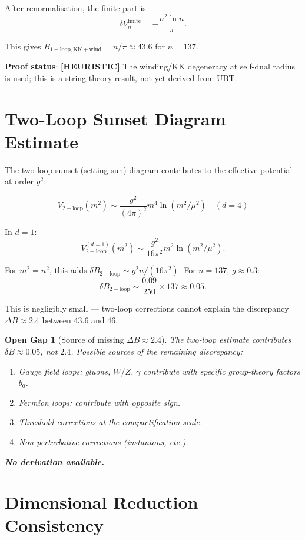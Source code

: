 \documentclass[11pt,a4paper]{article}
\newtheorem{gap}{Open Gap}
\newcommand{\heuristic}[1]{\textbf{[HEURISTIC]} #1}
\begin{document}
After renormalisation, the finite part is
\[
  \delta V_n^\mathrm{finite} = -\frac{n^2\ln n}{\pi}.
\]

This gives $B_\mathrm{1-loop,KK+wind} = n/\pi \approx 43.6$ for $n = 137$.

\textbf{Proof status}: \heuristic{The winding/KK degeneracy at self-dual
radius is used; this is a string-theory result, not yet derived from UBT.}

\section{Two-Loop Sunset Diagram Estimate}

The two-loop sunset (setting sun) diagram contributes to the effective
potential at order $g^2$:

\[
  V_\mathrm{2-loop}(m^2) \sim \frac{g^2}{(4\pi)^2} m^4\ln(m^2/\mu^2)
  \quad (d=4)
\]

In $d = 1$:
\[
  V_\mathrm{2-loop}^{(d=1)}(m^2) \sim \frac{g^2}{16\pi^2} m^2\ln(m^2/\mu^2).
\]

For $m^2 = n^2$, this adds $\delta B_\mathrm{2-loop} \sim g^2 n/(16\pi^2)$.
For $n = 137$, $g \approx 0.3$:
\[
  \delta B_\mathrm{2-loop} \sim \frac{0.09}{250}\times 137 \approx 0.05.
\]

This is negligibly small — two-loop corrections cannot explain the
discrepancy $\Delta B \approx 2.4$ between 43.6 and 46.

\begin{gap}[Source of missing $\Delta B \approx 2.4$]
  The two-loop estimate contributes $\delta B \approx 0.05$, not $2.4$.
  Possible sources of the remaining discrepancy:
  \begin{enumerate}
    \item Gauge field loops: gluons, $W/Z$, $\gamma$ contribute with specific
          group-theory factors $b_0$.
    \item Fermion loops: contribute with opposite sign.
    \item Threshold corrections at the compactification scale.
    \item Non-perturbative corrections (instantons, etc.).
  \end{enumerate}
  \textbf{No derivation available.}
\end{gap}

\section{Dimensional Reduction Consistency}
\end{document}
